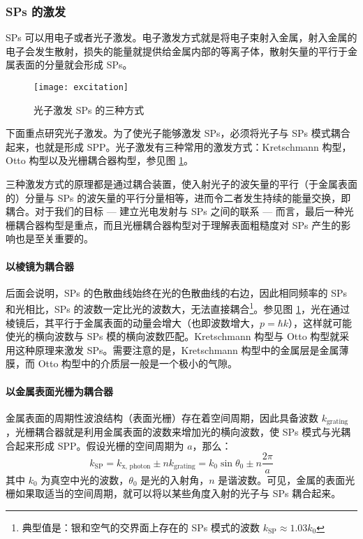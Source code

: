 \subsubsection{SPs 的激发}
SPs 可以用电子或者光子激发。电子激发方式就是将电子束射入金属，射入金属的电子会发生散射，损失的能量就提供给金属内部的等离子体，散射矢量的平行于金属表面的分量就会形成 SPs。

\begin{figure}[htbp]
\centering
\texttt{[image: excitation]}
\caption{\label{fig:exc} 光子激发 SPs 的三种方式}
\end{figure}

下面重点研究光子激发。为了使光子能够激发 SPs，必须将光子与 SPs 模式耦合起来，也就是形成 SPP。光子激发有三种常用的激发方式：Kretschmann 构型，Otto 构型以及光栅耦合器构型，参见图 \ref{fig:exc}。

三种激发方式的原理都是通过耦合装置，使入射光子的波矢量的平行（于金属表面的）分量与 SPs 的波矢量的平行分量相等，进而令二者发生持续的能量交换，即耦合。对于我们的目标 --- 建立光电发射与 SPs 之间的联系 --- 而言，最后一种光栅耦合器构型是重点，而且光栅耦合器构型对于理解表面粗糙度对 SPs 产生的影响也是至关重要的。

\paragraph{以棱镜为耦合器}
后面会说明，SPs 的色散曲线始终在光的色散曲线的右边，因此相同频率的 SPs 和光相比，SPs 的波数一定比光的波数大，无法直接耦合\footnote{典型值是：银和空气的交界面上存在的 SPs 模式的波数 $k_{\text{SP}}\approx 1.03k_0$}。参见图 \ref{fig:exc}，光在通过棱镜后，其平行于金属表面的动量会增大（也即波数增大，$p=\hbar k$），这样就可能使光的横向波数与 SPs 模的横向波数匹配。Kretschmann 构型与 Otto 构型就采用这种原理来激发 SPs。需要注意的是，Kretschmann 构型中的金属层是金属薄膜，而 Otto 构型中的介质层一般是一个极小的气隙。

\paragraph{以金属表面光栅为耦合器}
金属表面的周期性波浪结构（表面光栅）存在着空间周期，因此具备波数 $k_{\text{grating}}$，光栅耦合器就是利用金属表面的波数来增加光的横向波数，使 SPs 模式与光耦合起来形成 SPP。假设光栅的空间周期为 $a$，那么：
\[
	k_{\text{SP}} = k_{\text{x, photon}} \pm nk_{\text{grating}} = k_0\sin\theta_0 \pm n\dfrac{2\pi}{a}
\]
其中 $k_0$ 为真空中光的波数，$\theta_0$ 是光的入射角，$n$ 是谐波数。可见，金属的表面光栅如果取适当的空间周期，就可以将以某些角度入射的光子与 SPs 耦合起来。

